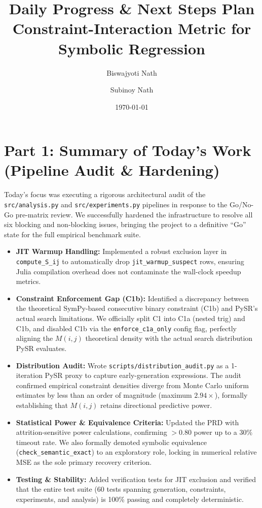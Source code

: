 \documentclass[11pt,a4paper]{article}
\title{\textbf{Daily Progress \& Next Steps Plan}\\
\large Constraint-Interaction Metric for Symbolic Regression}
\author{Biswajyoti Nath \and Subinoy Nath}
\date{\today}
\begin{document}
\maketitle

\section*{Part 1: Summary of Today's Work (Pipeline Audit \& Hardening)}

Today's focus was executing a rigorous architectural audit of the \texttt{src/analysis.py} and \texttt{src/experiments.py} pipelines in response to the Go/No-Go pre-matrix review. We successfully hardened the infrastructure to resolve all six blocking and non-blocking issues, bringing the project to a definitive ``Go'' state for the full empirical benchmark suite.

\begin{itemize}
    \item \textbf{JIT Warmup Handling:} Implemented a robust exclusion layer in \texttt{compute\_S\_ij} to automatically drop \texttt{jit\_warmup\_suspect} rows, ensuring Julia compilation overhead does not contaminate the wall-clock speedup metrics.
    \item \textbf{Constraint Enforcement Gap (C1b):} Identified a discrepancy between the theoretical SymPy-based consecutive binary constraint (C1b) and PySR's actual search limitations. We officially split C1 into C1a (nested trig) and C1b, and disabled C1b via the \texttt{enforce\_c1a\_only} config flag, perfectly aligning the $M(i,j)$ theoretical density with the actual search distribution PySR evaluates.
    \item \textbf{Distribution Audit:} Wrote \texttt{scripts/distribution\_audit.py} as a 1-iteration PySR proxy to capture early-generation expressions. The audit confirmed empirical constraint densities diverge from Monte Carlo uniform estimates by less than an order of magnitude (maximum $2.94\times$), formally establishing that $M(i,j)$ retains directional predictive power.
    \item \textbf{Statistical Power \& Equivalence Criteria:} Updated the PRD with attrition-sensitive power calculations, confirming $>0.80$ power up to a 30\% timeout rate. We also formally demoted symbolic equivalence (\texttt{check\_semantic\_exact}) to an exploratory role, locking in numerical relative MSE as the sole primary recovery criterion.
    \item \textbf{Testing \& Stability:} Added verification tests for JIT exclusion and verified that the entire test suite (60 tests spanning generation, constraints, experiments, and analysis) is 100\% passing and completely deterministic.
\end{itemize}
\end{document}
